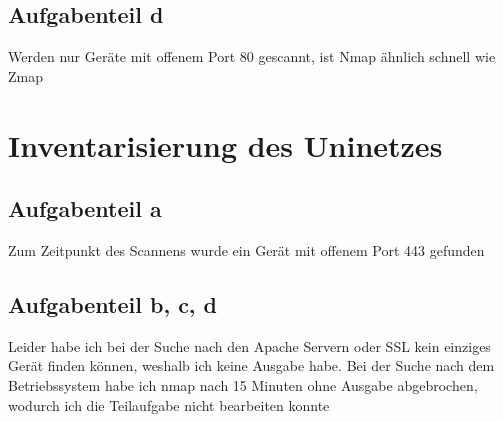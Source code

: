 \documentclass[a4paper,12pt,
headsepline,           %
twoside,               %
pointlessnumbers,      %
bibtotoc,              %
BCOR15mm               %
]{scrbook}
\begin{document}
\subsection*{Aufgabenteil d}

Werden nur Geräte mit offenem Port 80 gescannt, ist Nmap ähnlich schnell wie Zmap

\section*{Inventarisierung des Uninetzes}
\subsection*{Aufgabenteil a}
Zum Zeitpunkt des Scannens wurde ein Gerät mit offenem Port 443 gefunden


\subsection*{Aufgabenteil b, c, d}
Leider habe ich bei der Suche nach den Apache Servern oder SSL kein einziges Gerät finden können, weshalb ich keine Ausgabe habe. Bei der Suche nach dem Betriebssystem habe ich nmap nach 15 Minuten ohne Ausgabe abgebrochen, wodurch ich die Teilaufgabe nicht bearbeiten konnte
\end{document}
